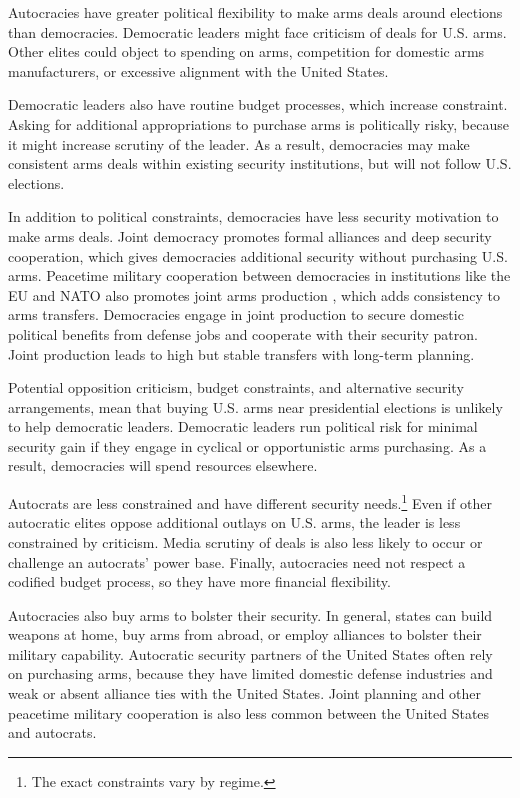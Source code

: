 \documentclass[12pt]{article}
\begin{document}
Autocracies have greater political flexibility to make arms deals around elections than democracies. 
Democratic leaders might face criticism of deals for U.S. arms.
Other elites could object to spending on arms, competition for domestic arms manufacturers, or excessive alignment with the United States.


Democratic leaders also have routine budget processes, which increase constraint.
Asking for additional appropriations to purchase arms is politically risky, because it might increase scrutiny of the leader. 
As a result, democracies may make consistent arms deals within existing security institutions, but will not follow U.S. elections.


In addition to political constraints, democracies have less security motivation to make arms deals. 
Joint democracy promotes formal alliances and deep security cooperation, which gives democracies additional security without purchasing U.S. arms. 
Peacetime military cooperation between democracies in institutions like the EU and NATO also promotes joint arms production \citep{Klare1983, Bitzinger1994}, which adds consistency to arms transfers. 
Democracies engage in joint production to secure domestic political benefits from defense jobs and cooperate with their security patron.
Joint production leads to high but stable transfers with long-term planning. 


Potential opposition criticism, budget constraints, and alternative security arrangements, mean that buying U.S. arms near presidential elections is unlikely to help democratic leaders.
Democratic leaders run political risk for minimal security gain if they engage in cyclical or opportunistic arms purchasing. 
As a result, democracies will spend resources elsewhere. 


Autocrats are less constrained and have different security needs.\footnote{The exact constraints vary by regime.}
Even if other autocratic elites oppose additional outlays on U.S. arms, the leader is less constrained by criticism.
Media scrutiny of deals is also less likely to occur or challenge an autocrats' power base. 
Finally, autocracies need not respect a codified budget process, so they have more financial flexibility.  


Autocracies also buy arms to bolster their security.
In general, states can build weapons at home, buy arms from abroad, or employ alliances to bolster their military capability. 
Autocratic security partners of the United States often rely on purchasing arms, because they have limited domestic defense industries and weak or absent alliance ties with the United States. 
Joint planning and other peacetime military cooperation is also less common between the United States and autocrats. 
\end{document}
